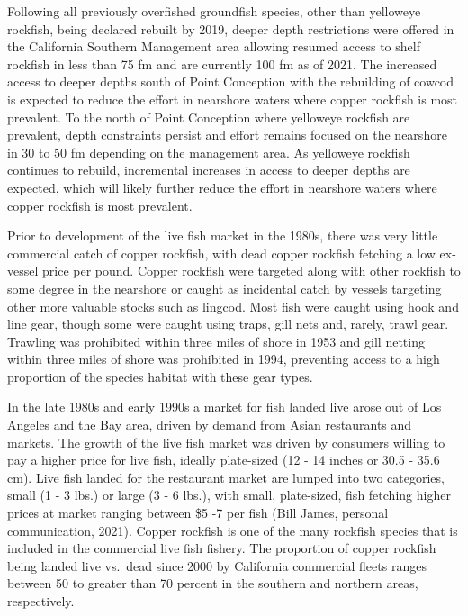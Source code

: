 \documentclass[11pt,
  english,
  letterpaper,
]{article}
\begin{document}
Following all previously overfished groundfish species, other than yelloweye rockfish, being declared rebuilt by 2019, deeper depth restrictions were offered in the California Southern Management area allowing resumed access to shelf rockfish in less than 75 fm and are currently 100 fm as of 2021. The increased access to deeper depths south of Point Conception with the rebuilding of cowcod is expected to reduce the effort in nearshore waters where copper rockfish is most prevalent. To the north of Point Conception where yelloweye rockfish are prevalent, depth constraints persist and effort remains focused on the nearshore in 30 to 50 fm depending on the management area. As yelloweye rockfish continues to rebuild, incremental increases in access to deeper depths are expected, which will likely further reduce the effort in nearshore waters where copper rockfish is most prevalent.

Prior to development of the live fish market in the 1980s, there was very little commercial catch of copper rockfish, with dead copper rockfish fetching a low ex-vessel price per pound. Copper rockfish were targeted along with other rockfish to some degree in the nearshore or caught as incidental catch by vessels targeting other more valuable stocks such as lingcod. Most fish were caught using hook and line gear, though some were caught using traps, gill nets and, rarely, trawl gear. Trawling was prohibited within three miles of shore in 1953 and gill netting within three miles of shore was prohibited in 1994, preventing access to a high proportion of the species habitat with these gear types.

In the late 1980s and early 1990s a market for fish landed live arose out of Los Angeles and the Bay area, driven by demand from Asian restaurants and markets. The growth of the live fish market was driven by consumers willing to pay a higher price for live fish, ideally plate-sized (12 - 14 inches or 30.5 - 35.6 cm). Live fish landed for the restaurant market are lumped into two categories, small (1 - 3 lbs.) or large (3 - 6 lbs.), with small, plate-sized, fish fetching higher prices at market ranging between \$5 -7 per fish (Bill James, personal communication, 2021). Copper rockfish is one of the many rockfish species that is included in the commercial live fish fishery. The proportion of copper rockfish being landed live vs.~dead since 2000 by California commercial fleets ranges between 50 to greater than 70 percent in the southern and northern areas, respectively.
\end{document}
